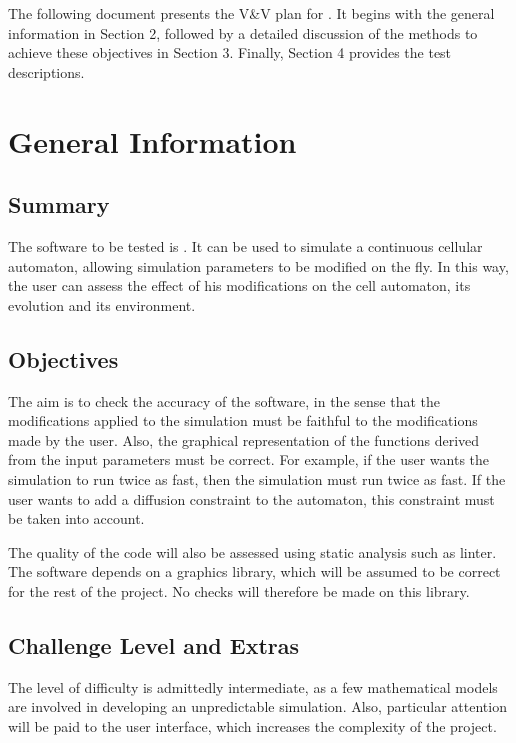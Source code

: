\documentclass[12pt, titlepage]{article}
\begin{document}
The following document presents the V\&V plan for \progname. It begins with the general information in Section 2, followed by a detailed discussion of the methods to achieve these objectives in Section 3. Finally, Section 4 provides the test descriptions.

\section{General Information}

\subsection{Summary}

The software to be tested is \progname. It can be used to simulate a continuous cellular automaton, allowing simulation parameters to be modified on the fly. 
In this way, the user can assess the effect of his modifications on the cell automaton, its evolution and its environment.

\subsection{Objectives}

The aim is to check the accuracy of the software, in the sense that the modifications applied to the simulation must be faithful to the modifications made by the user. 
Also, the graphical representation of the functions derived from the input parameters must be correct. 
For example, if the user wants the simulation to run twice as fast, then the simulation must run twice as fast.
If the user wants to add a diffusion constraint to the automaton, this constraint must be taken into account.

The quality of the code will also be assessed using static analysis such as linter.
The software depends on a graphics library, which will be assumed to be correct for the rest of the project. No checks will therefore be made on this library.

\subsection{Challenge Level and Extras}

The level of difficulty is admittedly intermediate, as a few mathematical models are involved in developing an unpredictable simulation.
 Also, particular attention will be paid to the user interface, which increases the complexity of the project.
\end{document}
